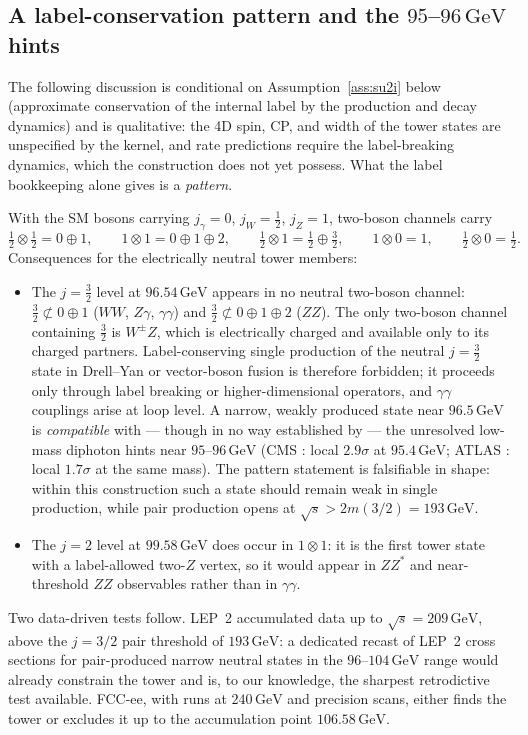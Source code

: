 \documentclass[11pt,a4paper]{article}
\theoremstyle{definition}
\newcommand{\GeV}{\,\mathrm{GeV}}
\begin{document}
\subsection{A label-conservation pattern and the $95$--$96\GeV$ hints}
\label{sec:selection}

The following discussion is conditional on Assumption~\ref{ass:su2i} below
(approximate conservation of the internal label by the production and decay
dynamics) and is qualitative: the 4D spin, CP, and width of the tower
states are unspecified by the kernel, and rate predictions require the
label-breaking dynamics, which the construction does not yet possess. What
the label bookkeeping alone gives is a \emph{pattern}.

With the SM bosons carrying $j_\gamma=0$, $j_W=\tfrac12$, $j_Z=1$,
two-boson channels carry
\[
\tfrac12\otimes\tfrac12=0\oplus1,\qquad
1\otimes1=0\oplus1\oplus2,\qquad
\tfrac12\otimes1=\tfrac12\oplus\tfrac32,\qquad
1\otimes0=1,\qquad \tfrac12\otimes 0=\tfrac12 .
\]
Consequences for the electrically neutral tower members:
\begin{itemize}
\item The $j=\tfrac32$ level at $96.54\GeV$ appears in no neutral two-boson
channel: $\tfrac32\not\subset0\oplus1$ ($WW$, $Z\gamma$, $\gamma\gamma$)
and $\tfrac32\not\subset0\oplus1\oplus2$ ($ZZ$). The only two-boson channel
containing $\tfrac32$ is $W^\pm Z$, which is electrically charged and
available only to its charged partners. Label-conserving single production
of the neutral $j=\tfrac32$ state in Drell--Yan or vector-boson fusion is
therefore forbidden; it proceeds only through label breaking or
higher-dimensional operators, and $\gamma\gamma$ couplings arise at loop
level. A narrow, weakly produced state near $96.5\GeV$ is \emph{compatible}
with --- though in no way established by --- the unresolved low-mass
diphoton hints near $95$--$96\GeV$ (CMS \cite{cms95}: local $2.9\sigma$ at
$95.4\GeV$; ATLAS \cite{atlas95}: local $1.7\sigma$ at the same mass). The
pattern statement is falsifiable in shape: within this construction such a
state should remain weak in single production, while pair production opens
at $\sqrt{s}>2m(3/2)=193\GeV$.
\item The $j=2$ level at $99.58\GeV$ does occur in $1\otimes1$: it is the
first tower state with a label-allowed two-$Z$ vertex, so it would appear
in $ZZ^{*}$ and near-threshold $ZZ$ observables rather than in
$\gamma\gamma$.
\end{itemize}
Two data-driven tests follow. LEP~2 accumulated data up to
$\sqrt s=209\GeV$, above the $j=3/2$ pair threshold of $193\GeV$: a
dedicated recast of LEP~2 cross sections for pair-produced narrow neutral
states in the $96$--$104\GeV$ range would already constrain the tower and
is, to our knowledge, the sharpest retrodictive test available. FCC-ee,
with runs at $240\GeV$ and precision scans, either finds the tower or
excludes it up to the accumulation point $106.58\GeV$.
\end{document}
